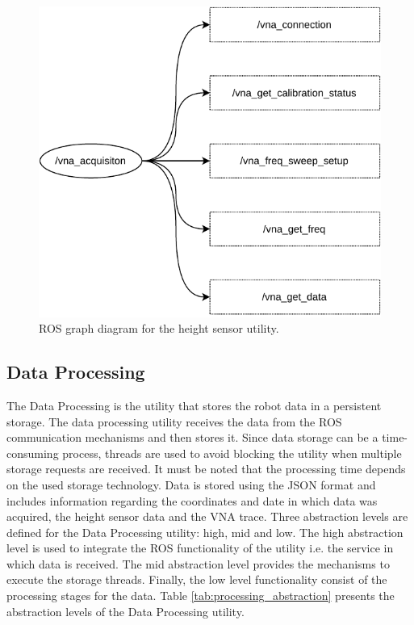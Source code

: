 \documentclass{article}
\begin{document}
\begin{figure}[H]
    \centering
    \includegraphics{images/ROS/vna_acquisition/ros_vna_acquisition.pdf}
    \caption{ROS graph diagram for the height sensor utility.}
    \label{fig:acquisition_graph}
\end{figure}

\subsection{Data Processing}
The Data Processing is the utility that stores the robot data in a persistent storage. The data processing utility receives the data from the ROS communication mechanisms and then stores it. Since data storage can be a time-consuming process, threads are used to avoid blocking the utility when multiple storage requests are received. It must be noted that the processing time depends on the used storage technology. Data is stored using the JSON format and includes information regarding the coordinates and date in which data was acquired, the height sensor data and the VNA trace. Three abstraction levels are defined for the Data Processing utility: high, mid and low. The high abstraction level is used to integrate the ROS functionality of the utility i.e. the service in which data is received. The mid abstraction level provides the mechanisms to execute the storage threads. Finally, the low level functionality consist of the processing stages for the data. Table \ref{tab:processing_abstraction} presents the abstraction levels of the Data Processing utility.
\end{document}
